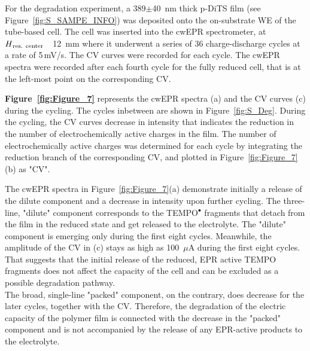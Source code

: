 \documentclass{WileyMSP-template}
\newcommand{\ik}[1]{\textcolor{RawSienna}{#1}}
\begin{document}
\bigbreak

\ik{
For the degradation experiment, a 389$\pm$40~nm thick p-DiTS film (see Figure~\ref{fig:S_SAMPE_INFO}) was deposited onto the on-substrate WE of the tube-based cell. The cell was inserted into the cwEPR spectrometer, at $H\textsubscript{res. center}$~~12~mm where it underwent a series of 36 charge-discharge cycles at a rate of 5$\,$mV/s. The CV curves were recorded for each cycle. The cwEPR spectra were recorded after each fourth cycle for the fully reduced cell, that is at the left-most point on the corresponding CV.\\
}

\bigbreak

\ik{
\textbf{Figure~\ref{fig:Figure_7}} represents the cwEPR spectra (a) and the CV curves (c) during the cycling. The cycles inbetween are shown in Figure~\ref{fig:S_Deg}. During the cycling, the CV curves decrease in intensity that indicates the reduction in the number of electrochemically active charges in the film. The number of electrochemically active charges was determined for each cycle by integrating the reduction branch of the corresponding CV, and plotted in Figure~\ref{fig:Figure_7}(b) as "CV".\\
}

\bigbreak

\ik{
The cwEPR spectra in Figure~\ref{fig:Figure_7}(a) demonstrate initially a release of the dilute component and a decrease in intensity upon further cycling. 
The three-line, "dilute" component corresponds
to the TEMPO$^{\bullet}$ fragments that detach from the film in the reduced state and get released to the electrolyte. The "dilute" component is emerging only during the first eight cycles. Meanwhile, the amplitude of the CV in (c) stays as high as 100~$\mu$A during the first eight cycles. That suggests that the initial release of the reduced, EPR active TEMPO fragments does not affect the capacity of the cell and can be excluded as a possible degradation pathway.\\ 
The broad, single-line "packed" component, on the contrary, does decrease for the later cycles, together with the CV. Therefore, the degradation of the electric capacity of the polymer film is connected with the decrease in the "packed" component and is not accompanied by the release of any EPR-active products to the electrolyte.\\
}
\end{document}
